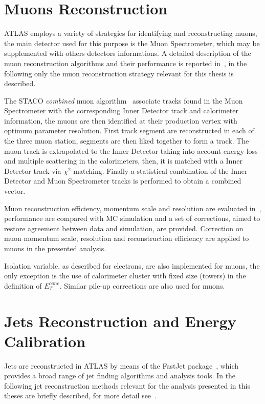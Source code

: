 \section{Muons Reconstruction}\label{sec:muon}
ATLAS employs a variety of strategies for identifying and reconstructing muons, 
the main detector used for this purpose is the Muon Spectrometer, which may be supplemented with
others detectors informations. A detailed description
of the muon reconstruction algorithms and their performance is reported in~\cite{AtlasCSCBook},
in the following only the muon reconstruction strategy relevant for this thesis is described.

The STACO \emph{combined} muon algorithm~\cite{staco} associate tracks found in the
Muon Spectrometer with the corresponding Inner Detector track and calorimeter information, the muons are then
 identified at their production vertex with optimum parameter resolution.
First  track segment are reconstructed in each of the three
muon station, segments are then liked together to form a track. The muon track is
extrapolated to the Inner Detector taking into account energy loss and multiple scattering in the calorimeters,
then, it is  matched with a Inner Detector track via $\chi^2$ matching. Finally
a statistical combination of the Inner Detector and Muon Spectrometer tracks is performed to obtain a combined vector. 

Muon reconstruction efficiency, momentum scale and resolution are evaluated in~\cite{muoneffres},
performance are compared with MC simulation and a set of corrections, aimed to restore agreement
between data and simulation, are provided. Correction on muon momentum scale, resolution and reconstruction
efficiency are applied to muons in the presented analysis.

Isolation variable, as described for electrons, are also implemented for muons, the only exception 
is the use of calorimeter cluster with fixed size (towers) in the definition of $E_T^{cone}$.
Similar pile-up corrections are also used for muons.  



\section{Jets Reconstruction and Energy Calibration}
Jets are reconstructed in ATLAS by means of the FastJet package~\cite{fastjet}, 
which provides a broad range of jet finding algorithms and analysis tools. 
In the following jet reconstruction methods relevant for the
analysis presented in this theses are briefly described, for more detail see~\cite{AtlasCSCBook}.

